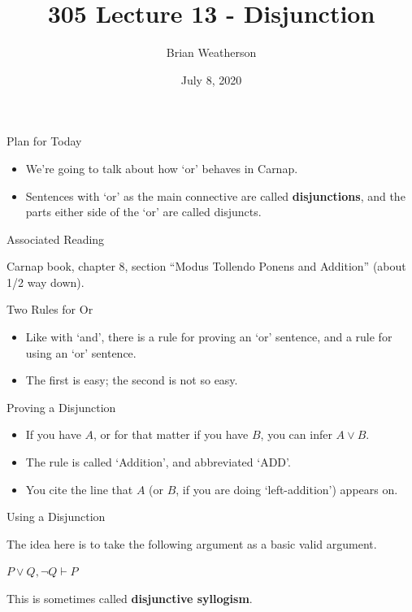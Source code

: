 \documentclass[
  ignorenonframetext,
]{beamer}
\title{305 Lecture 13 - Disjunction}
\author{Brian Weatherson}
\date{July 8, 2020}
\providecommand{\tightlist}{%
  \setlength{\itemsep}{0pt}\setlength{\parskip}{0pt}}
\renewcommand{\,}{\text{, }}
\renewenvironment*{quote}	
	{\list{}{\rightmargin   \leftmargin} \item } 	
	{\endlist }
\begin{document}
\frame{\titlepage}

\begin{frame}{Plan for Today}
\protect\hypertarget{plan-for-today}{}

\begin{itemize}
\tightlist
\item
  We're going to talk about how `or' behaves in Carnap.
\item
  Sentences with `or' as the main connective are called
  \textbf{disjunctions}, and the parts either side of the `or' are
  called disjuncts.
\end{itemize}

\end{frame}

\begin{frame}{Associated Reading}
\protect\hypertarget{associated-reading}{}

Carnap book, chapter 8, section ``Modus Tollendo Ponens and Addition''
(about 1/2 way down).

\end{frame}

\begin{frame}{Two Rules for Or}
\protect\hypertarget{two-rules-for-or}{}

\begin{itemize}
\tightlist
\item
  Like with `and', there is a rule for proving an `or' sentence, and a
  rule for using an `or' sentence.
\item
  The first is easy; the second is not so easy.
\end{itemize}

\end{frame}

\begin{frame}{Proving a Disjunction}
\protect\hypertarget{proving-a-disjunction}{}

\begin{itemize}
\tightlist
\item
  If you have \(A\), or for that matter if you have \(B\), you can infer
  \(A \vee B\).
\item
  The rule is called `Addition', and abbreviated `ADD'.
\item
  You cite the line that \(A\) (or \(B\), if you are doing
  `left-addition') appears on.
\end{itemize}

\end{frame}

\begin{frame}{Using a Disjunction}
\protect\hypertarget{using-a-disjunction}{}

The idea here is to take the following argument as a basic valid
argument.

\begin{quote}
\(P \vee Q, \neg Q \vdash P\)
\end{quote}

This is sometimes called \textbf{disjunctive syllogism}.

\end{frame}
\end{document}
